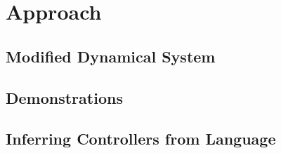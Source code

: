 \section{Approach}
\label{sec:approach}

\subsection{Modified Dynamical System}

\subsection{Demonstrations}

\subsection{Inferring Controllers from Language}
